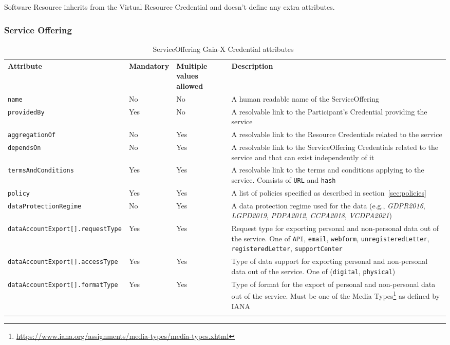 Software Resource inherits from the Virtual Resource Credential and doesn't define any extra attributes.

\subsubsection{Service Offering}

\begin{longtable}{ |p{4cm}|p{2cm}|p{2cm}|p{7cm}| }
    \hhline{----}
    \textbf{Attribute} & \textbf{Mandatory} & \textbf{Multiple values allowed} & \textbf{Description}\\
    \hhline{----}
    \texttt{name} & No & No & A human readable name of the ServiceOffering\\
    \hhline{----}
    \texttt{providedBy} & Yes & No & A resolvable link to the Participant's Credential providing the service\\
    \hhline{----}
    \texttt{aggregationOf} & No & Yes & A resolvable link to the Resource Credentials related to the service\\
    \hhline{----}
    \texttt{dependsOn} & No & Yes & A resolvable link to the ServiceOffering Credentials related to the service and that can exist independently of it\\
    \hhline{----}
    \texttt{termsAndConditions} & Yes & Yes & A resolvable link to the terms and conditions applying to the service.
    Consists of \texttt{URL} and \texttt{hash}\\
    \hhline{----}
    \texttt{policy} & Yes & Yes & A list of policies specified as described in section~\ref{sec:policies}\\
    \hhline{----}
    \texttt{dataProtectionRegime} & No & Yes & A data protection regime used for the data (e.g., \textit{GDPR2016}, \textit{LGPD2019}, \textit{PDPA2012}, \textit{CCPA2018}, \textit{VCDPA2021})\\
    \hhline{----}
    \texttt{dataAccountExport[].requestType} & Yes & Yes & Request type for exporting personal and non-personal data out of the service.
    One of \texttt{API}, \texttt{email}, \texttt{webform}, \texttt{unregisteredLetter}, \texttt{registeredLetter}, \texttt{supportCenter}\\
    \hhline{----}
    \texttt{dataAccountExport[].accessType} & Yes & Yes & Type of data support for exporting personal and non-personal data out of the service.
    One of (\texttt{digital}, \texttt{physical})\\
    \hhline{----}
    \texttt{dataAccountExport[].formatType} & Yes & Yes & Type of format for the export of personal and non-personal data out of the service.
    Must be one of the Media Types\footnote{\url{https://www.iana.org/assignments/media-types/media-types.xhtml}} as defined by IANA\\
    \hhline{----}
    \caption{ServiceOffering Gaia-X Credential attributes~\cite{gaiax_trust_framework}}
    \label{tab:service_offering}
\end{longtable}

